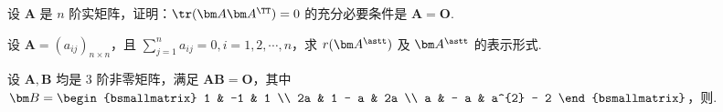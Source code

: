 	\begin{titwo}
		设 $\bm A$ 是 $n$ 阶实矩阵，证明：$\tr(\bm A \bm A^{\TT}) = 0$ 的充分必要条件是 $\bm A = \bm O$.
	\end{titwo}

	\begin{titwo}
		设 $\bm A = (a_{ij})_{n \times n}$，且 $\sum_{j=1}^{n} a_{ij} = 0, i = 1,2,\cdots,n$，求 $r(\bm A^{\astt})$ 及 $\bm A^{\astt}$ 的表示形式.
	\end{titwo}

	\begin{titwo}
		设 $\bm A, \bm B$ 均是 $3$ 阶非零矩阵，满足 $\bm A \bm B = \bm O$，其中 $\bm B = \begin{bsmallmatrix}
			1 & -1 & 1 \\
			2a & 1 - a & 2a \\
			a & - a & a^{2} - 2
		\end{bsmallmatrix}$，则\kuo.

	\end{titwo}